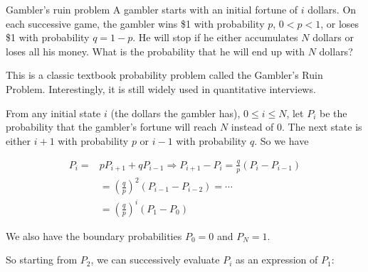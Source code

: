 \begin{problem}{Gambler's ruin problem}
A gambler starts with an initial fortune of $i$ dollars. On each successive game, the
gambler wins \$1 with probability $p$, $0<p<1$, or loses \$1 with probability $q=1-p$.
He will stop if he either accumulates $N$ dollars or loses all his money. What is the
probability that he will end up with $N$ dollars?
\end{problem}

\begin{solution}
This is a classic textbook probability problem called the Gambler's Ruin Problem.
Interestingly, it is still widely used in quantitative interviews.

From any initial state $i$ (the dollars the gambler has), $0\leq i\leq N$, let $P_i$ be the probability
that the gambler's fortune will reach $N$ instead of 0. The next state is either $i+1$ with
probability $p$ or $i-1$ with probability $q$. So we have

\[
\begin{aligned}
P_i={}&pP_{i+1}+qP_{i-1}\Rightarrow P_{i+1}-P_i=\frac{q}{p}(P_i-P_{i-1})\\
&=\left(\frac{q}{p}\right)^2(P_{i-1}-P_{i-2})=\cdots\\
&=\left(\frac{q}{p}\right)^i(P_1-P_0)
\end{aligned}
\]

We also have the boundary probabilities $P_0=0$ and $P_N=1$.

So starting from $P_2$, we can successively evaluate $P_i$ as an expression of $P_1$:
\end{solution}
